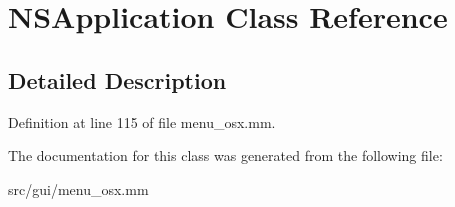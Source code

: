 \hypertarget{classNSApplication}{\section{N\-S\-Application Class Reference}
\label{classNSApplication}
}


\subsection{Detailed Description}


Definition at line 115 of file menu\-\_\-osx.\-mm.



The documentation for this class was generated from the following file\-:\begin{DoxyCompactItemize}
\item 
src/gui/menu\-\_\-osx.\-mm\end{DoxyCompactItemize}
